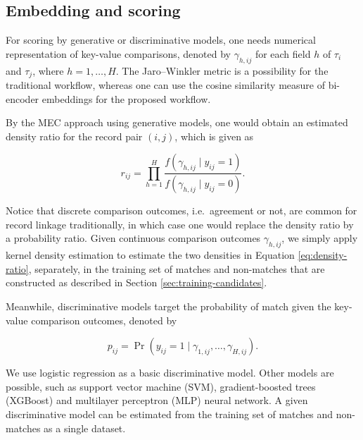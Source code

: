 \subsection{Embedding and scoring}
\label{sec:embedding-scoring}

For scoring by generative or discriminative models, one needs numerical representation of
key-value comparisons, denoted by $\gamma_{h,ij}$ for each field $h$ of $\tau_i$ and
$\tau_j$, where $h=1,\ldots,H$. The Jaro--Winkler metric is a possibility for the
traditional workflow, whereas one can use the cosine similarity measure of bi-encoder
embeddings for the proposed workflow.

By the MEC approach using generative models, one would obtain an estimated density
ratio for the record pair $(i,j)$, which is given as

\begin{equation}
\label{eq:density-ratio}
r_{ij}
=
\prod_{h=1}^{H}
\frac{
f(\gamma_{h,ij}\mid y_{ij}=1)
}{
f(\gamma_{h,ij}\mid y_{ij}=0)
}.
\end{equation}


Notice that discrete comparison outcomes, i.e.\ agreement or not, are common for record
linkage traditionally, in which case one would replace the density ratio by a probability
ratio. Given continuous comparison outcomes $\gamma_{h,ij}$, we simply apply kernel
density estimation \citep{silverman1986density} to estimate the two densities in
Equation \eqref{eq:density-ratio}, separately, in the training set of matches and non-matches that are constructed as
described in Section \ref{sec:training-candidates}.

Meanwhile, discriminative models target the probability of match given the key-value
comparison outcomes, denoted by

\begin{equation}
\label{eq:match-probability}
p_{ij}
=
\Pr\left(
y_{ij}=1
\mid
\gamma_{1,ij},\ldots,\gamma_{H,ij}
\right).
\end{equation}

We use logistic regression as a basic discriminative model. Other models are possible,
such as support vector machine (SVM), gradient-boosted trees (XGBoost) and multilayer
perceptron (MLP) neural network. A given discriminative model can be estimated from
the training set of matches and non-matches as a single dataset.

